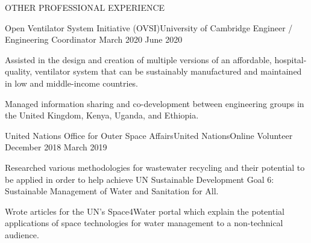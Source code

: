 \documentclass{resume} %
\begin{document}
\begin{rSection}{OTHER PROFESSIONAL EXPERIENCE }

\begin{rSubsection} {Open Ventilator System Initiative (OVSI)}{University of Cambridge}
 {Engineer / Engineering Coordinator }{March 2020 {\textendash} June 2020}
\item  Assisted in the design and creation of multiple versions of an affordable, hospital-quality, ventilator system that can be sustainably manufactured and maintained in low and middle-income countries.
\item Managed information sharing and co-development between engineering groups in the United Kingdom, Kenya, Uganda, and Ethiopia.
\end{rSubsection}

\begin{rSubsection}
{United Nations Office for Outer Space Affairs}{United Nations}{Online Volunteer}{	 December 2018 {\textendash} March 2019}

 \item Researched various methodologies for wastewater recycling and their potential to be applied in order to help achieve UN Sustainable Development Goal 6: Sustainable Management of Water and Sanitation for All.
\item  Wrote articles for the UN's Space4Water portal which explain the potential applications of space technologies for water management to a non-technical audience.

\end{rSubsection}



\end{rSection}
\end{document}

